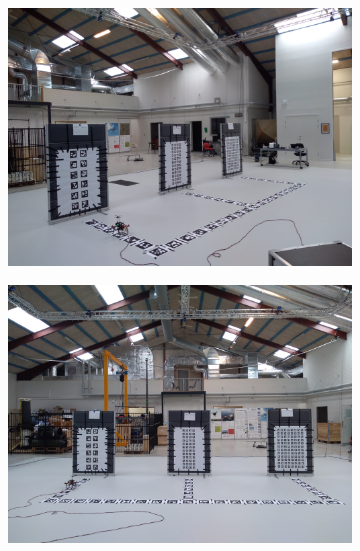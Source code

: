 \documentclass[../Head/report.tex]{subfiles}
\begin{document}
\begin{figure}[H]
    \centering
    \begin{subfigure}[t]{.30\textwidth}
        \centering
        \includegraphics[width=\textwidth]{../Figures/optitrack/optitrack_left.jpg}
        \caption{}
        \label{fig:optitrack_left}
    \end{subfigure}
     \hspace{0.2em}
    \begin{subfigure}[t]{.30\textwidth}
        \centering
        \includegraphics[width=\textwidth]{../Figures/optitrack/optitrack_straight.jpg}
        \caption{}
        \label{fig:optitrack_straight}
    \end{subfigure}
         \hspace{0.2em}

\end{figure}
\end{document}
